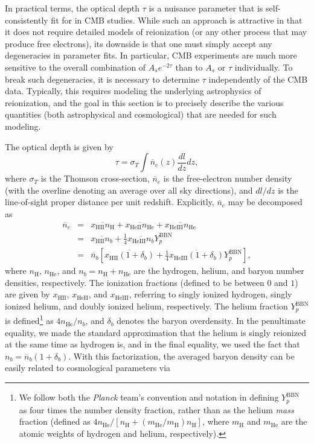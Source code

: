 \documentclass[twocolumn,aps,prd,nofootinbib,showpacs]{revtex4-1}
\begin{document}
In practical terms, the optical depth $\tau$ is a nuisance parameter that is self-consistently fit for in CMB studies. While such an approach is attractive in that it does not require detailed models of reionization (or any other process that may produce free electrons), its downside is that one must simply accept any degeneracies in parameter fits. In particular, CMB experiments are much more sensitive to the overall combination of $A_s e^{-2\tau}$ than to $A_s$ or $\tau$ individually. To break such degeneracies, it is necessary to determine $\tau$ independently of the CMB data. Typically, this requires modeling the underlying astrophysics of reionization, and the goal in this section is to precisely describe the various quantities (both astrophysical and cosmological) that are needed for such modeling.

The optical depth is given by
\begin{equation}
\tau = \sigma_T \int    \overline{n}_e (z)  \frac{dl}{dz} dz,
\end{equation}
where $\sigma_T$ is the Thomson cross-section, $\overline{n}_e$ is the free-electron number density (with the overline denoting an average over all sky directions), and $dl/dz$ is the line-of-sight proper distance per unit redshift. Explicitly, $\overline{n}_e$ may be decomposed as
\begin{eqnarray}
\overline{n}_e &=& \overline{x_\textrm{HII} n_\textrm{H}} + \overline{x_\textrm{HeII} n_\textrm{He}} + \overline{x_\textrm{HeIII} n_\textrm{He}} \nonumber \\
&=& \overline{x_\textrm{HII} n_b} + \frac{1}{4}\overline{x_\textrm{HeIII} n_b}Y_p^\textrm{BBN} \nonumber \\
&=& \overline{n}_b \left[  \overline{x_\textrm{HII} (1+\delta_b)} + \frac{1}{4}\overline{x_\textrm{HeIII} (1+\delta_b)} Y_p^\textrm{BBN} \right],
\end{eqnarray}
where $n_\textrm{H}$, $n_\textrm{He}$, and $n_b = n_\textrm{H} + n_\textrm{He}$ are the hydrogen, helium, and baryon number densities, respectively. The ionization fractions (defined to be between $0$ and $1$) are given by $x_\textrm{HII}$, $x_\textrm{HeII}$, and $x_\textrm{HeIII}$, referring to singly ionized hydrogen, singly ionized helium, and doubly ionized helium, respectively. The helium fraction $Y_p^\textrm{BBN}$ is defined\footnote{We follow both the \emph{Planck} team's convention and notation in defining $Y_p^\textrm{BBN}$ as four times the number density fraction, rather than as the helium \emph{mass} fraction (defined as $4n_\textrm{He} / [n_\textrm{H} + (m_\textrm{He} / m_\textrm{H}) n_\textrm{H} ]$, where $m_\textrm{H}$ and $m_\textrm{He}$ are the atomic weights of hydrogen and helium, respectively).} as $4n_\textrm{He} / n_b$, and $\delta_b$ denotes the baryon overdensity. In the penultimate equality, we made the standard approximation that the helium is singly reionized at the same time as hydrogen is, and in the final equality, we used the fact that $n_b =\overline{n}_b ( 1+ \delta_b)$. With this factorization, the averaged baryon density can be easily related to cosmological parameters via
\end{document}
